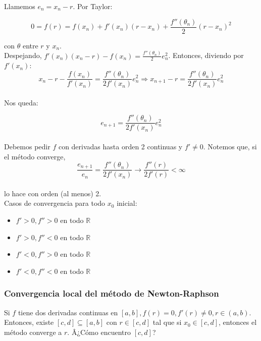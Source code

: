 Llamemos $e_{n} = x_{n} - r$. Por Taylor:

$$0 = f(r) = f(x_{n}) + f'(x_{n})(r - x_{n}) + \frac{f''(\theta_{n})}{2}(r - x_{n})^{2}$$

con $\theta$ entre $r$ y $x_{n}$.\\

Despejando, $f'(x_{n})(x_{n} - r) - f(x_{n}) = \frac{f''(\theta_{n})}{2}e_{n}^{2}$. Entonces, diviendo por $f'(x_{n})$:\\

$$x_{n} - r - \frac{f(x_{n})}{f'(x_{n})} = \frac{f''(\theta_{n})}{2f'(x_{n})}e_{n}^{2} \Rightarrow x_{n + 1} - r = \frac{f''(\theta_{n})}{2f'(x_{n})}e_{n}^{2}$$\\

Nos queda:

$$e_{n + 1} = \frac{f''(\theta_{n})}{2f'(x_{n})}e_{n}^{2}$$\\

Debemos pedir $f$ con derivadas hasta orden 2 continuas y $f' \neq 0$. Notemos que, si el m\'etodo converge,\\

$$\frac{e_{n + 1}}{e_{n}} = \frac{f''(\theta_{n})}{2f'(x_{n})} \rightarrow \frac{f''(r)}{2f'(r)} < \infty$$\\

lo hace con orden (al menos) 2.\\

Casos de convergencia para todo $x_{0}$ inicial:

\begin{itemize}
    \item $f' > 0, f'' > 0$ en todo $\mathbb{R}$
    \item $f' > 0, f'' < 0$ en todo $\mathbb{R}$
    \item $f' < 0, f'' > 0$ en todo $\mathbb{R}$
    \item $f' < 0, f'' < 0$ en todo $\mathbb{R}$
\end{itemize}

\subsubsection{Convergencia local del m\'etodo de Newton-Raphson}

Si $f$ tiene dos derivadas continuas en $[a, b], f(r) = 0, f'(r) \neq 0, r \in (a, b)$. Entonces, existe $[c, d] \subseteq [a, b]$ con $r \in [c, d]$ tal que si $x_{0} \in [c, d]$, entonces el m\'etodo converge a $r$. Â¿C\'omo encuentro $[c, d]$?\\

